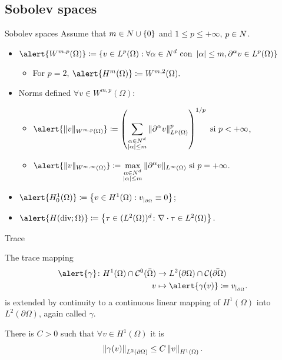 \subsection{Sobolev spaces}
\begin{frame}{Sobolev spaces}
Assume that $m\in\relax N\cup\left\{0\right\}$ and $1\leq p\leq+\infty$, $p\in\relax N$.
\begin{itemize}\itemsep1em
	\item$\displaystyle\alert{W^{m,p}(\Omega)}\coloneqq\{v\in L^p(\Omega):\forall\alpha\in\N^d\mbox{ con }\left|\alpha\right|\leq m, \partial^\alpha v\in L^p(\Omega)\}$
	\begin{itemize}\itemsep1em
		\item For $p=2$, $\alert{H^{m}(\Omega)}\coloneqq W^{m,2}(\Omega).$
	\end{itemize}
	
	\item Norms defined $\forall v\in W^{m,p}(\Omega)$:
	\begin{itemize}\itemsep1em
		\item $\displaystyle \alert{\|v\|_{W^{m,p}(\Omega)}}\coloneqq\left(\suma{\substack{\alpha\in\N^d \\ \left|\alpha\right|\leq m}}{}\|\partial^\alpha v\|^p_{L^p(\Omega)}\right)^{1/p}\text{ si }p<+\infty$,
		\item $\displaystyle \alert{\|v\|_{W^{m,\infty}(\Omega)}}\coloneqq\max_{\substack{\alpha\in\N^d \\ \left|\alpha\right|\leq m}}{}\|\partial^\alpha v\|_{L^\infty(\Omega)}\text{ si }p=+\infty$.
	\end{itemize}
	
	\item $\alert{H_0^1(\Omega)}\coloneqq\left\{v\in H^1(\Omega):v_{|_{\partial\Omega}}\equiv 0\right\}$;
	\item $\alert{H(\text{div};\Omega)}\coloneqq\left\{\tau\in(L^2(\Omega))^d\colon\nabla\cdot\tau\in L^2(\Omega) \right\}.$
	
\end{itemize}

\end{frame}

\begin{frame}{Trace}

	\begin{theorem}[Trace]
		
		The trace mapping
		\begin{align*}
		\alert{\gamma}\colon H^1(\Omega)\cap\mathcal{C}^0(\bar{\Omega})&\to L^2(\partial\Omega)\cap \mathcal{C}(\bar{\partial\Omega})\\
		v	&\mapsto\alert{\gamma(v)}\coloneqq v_{|_{\partial\Omega}}.
		\end{align*}
		is extended by continuity to a continuous linear mapping of $H^1(\Omega)$ into $L^2(\partial\Omega)$,  again called $\gamma$.
		
		There is $C>0$ such that $\forall v\in H^1(\Omega)$ it is $$\left\|\gamma(v)\right\|_{L^2(\partial \Omega)}\leq C\left\|v\right\|_{H^1(\Omega)}.$$
	\end{theorem}
	
\end{frame}

